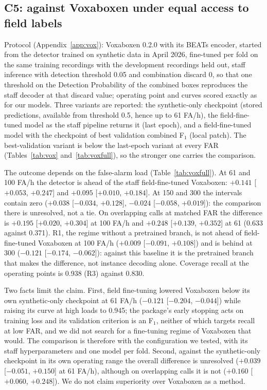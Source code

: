 \documentclass[10pt,twocolumn]{article}
\newcommand{\Fone}{F$_1$}
\begin{document}
\subsection{C5: against Voxaboxen under equal access to field labels}
\label{sec:vox}
Protocol (Appendix~\ref{app:vox}): Voxaboxen 0.2.0 with its BEATs encoder, started from the detector trained on synthetic data in April 2026, fine-tuned per fold on the same training recordings with the development recordings held out, staff inference with detection threshold 0.05 and combination discard 0, so that one threshold on the Detection Probability of the combined boxes reproduces the staff decoder at that discard value; operating point and curves scored exactly as for our models. Three variants are reported: the synthetic-only checkpoint (stored predictions, available from threshold 0.5, hence up to 61 FA/h), the field-fine-tuned model as the staff pipeline returns it (last epoch), and a field-fine-tuned model with the checkpoint of best validation combined \Fone{} (local patch). The best-validation variant is below the last-epoch variant at every FAR (Tables~\ref{tab:vox} and~\ref{tab:voxfull}), so the stronger one carries the comparison.

The outcome depends on the false-alarm load (Table~\ref{tab:voxfull}). At 61 and 100 FA/h the detector is ahead of the staff field-fine-tuned Voxaboxen: $+0.141$ [$+0.053$, $+0.247$] and $+0.095$ [$+0.010$, $+0.184$]. At 150 and 300 the intervals contain zero ($+0.038$ [$-0.034$, $+0.128$], $-0.024$ [$-0.058$, $+0.019$]): the comparison there is unresolved, not a tie. On overlapping calls at matched FAR the difference is $+0.195$ [$+0.020$, $+0.304$] at 100 FA/h and $+0.248$ [$+0.139$, $+0.352$] at 61 (0.633 against 0.371). R1, the regime without a pretrained branch, is not ahead of field-fine-tuned Voxaboxen at 100 FA/h ($+0.009$ [$-0.091$, $+0.108$]) and is behind at 300 ($-0.121$ [$-0.174$, $-0.062$]): against this baseline it is the pretrained branch that makes the difference, not instance decoding alone. Coverage recall at the operating points is 0.938 (R3) against 0.830.

Two facts limit the claim. First, field fine-tuning lowered Voxaboxen below its own synthetic-only checkpoint at 61 FA/h ($-0.121$ [$-0.204$, $-0.044$]) while raising its curve at high loads to 0.945; the package's early stopping acts on training loss and its validation criterion is an \Fone{}, neither of which targets recall at low FAR, and we did not search for a fine-tuning regime of Voxaboxen that would. The comparison is therefore with the configuration we tested, with its staff hyperparameters and one model per fold. Second, against the synthetic-only checkpoint in its own operating range the overall difference is unresolved ($+0.039$ [$-0.051$, $+0.150$] at 61 FA/h), although on overlapping calls it is not ($+0.160$ [$+0.060$, $+0.248$]). We do not claim superiority over Voxaboxen as a method.
\end{document}
